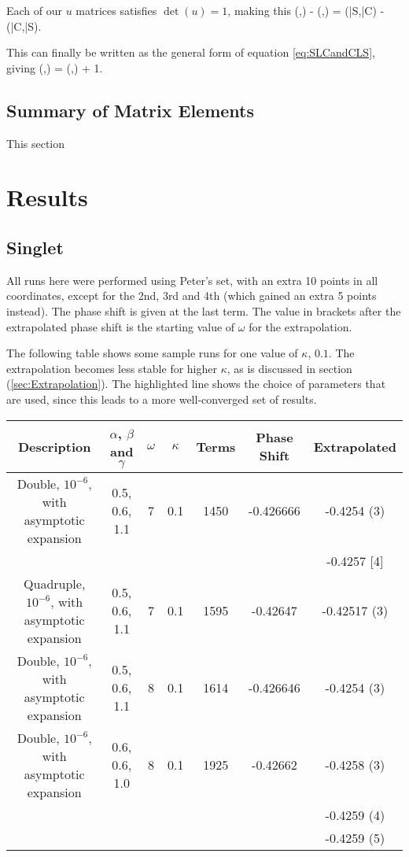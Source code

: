 \documentclass[Dissertation.tex]{subfiles}
\begin{document}
\noindent Each of our $u$ matrices satisfies $\det(u) = 1$, making this
\beq
(,) - (,) = (\bar{S},\bar{C}) - (\bar{C},\bar{S}).
\eeq

\noindent This can finally be written as the general form of equation \ref{eq:SLCandCLS}, giving
\beq
(,) = (,) + 1.
\label{eq:GenSLCandCLS}
\eeq

\subsection{Summary of Matrix Elements}
\label{SWaveMatrixSummary}
This section 



\section{Results}

\subsection{Singlet}
All runs here were performed using Peter's set, with an extra 10 points in all coordinates, except for the 2nd, 3rd and 4th (which gained an extra 5 points instead).  The phase shift is given at the last term.  The value in brackets after the extrapolated phase shift is the starting value of $\omega$ for the extrapolation.

The following table shows some sample runs for one value of $\kappa$, $0.1$.  The extrapolation becomes less stable for higher $\kappa$, as is discussed in section (\ref{sec:Extrapolation}).  The highlighted line shows the choice of parameters that are used, since this leads to a more well-converged set of results.

\begin{center}
\begin{tabular}{|c|c|c|c|c|c|c|}
\hline
Description & $\alpha$, $\beta$ and $\gamma$ & $\omega$ & $\kappa$ & Terms & Phase Shift & Extrapolated\\
\hline
\rowcolor{LightCyan} Double, $10^{-6}$, with asymptotic expansion & 0.5, 0.6, 1.1 & 7 & 0.1 & 1450 & -0.426666 & -0.4254 (3) \\
& & & & & & -0.4257 [4] \\
Quadruple, $10^{-6}$, with asymptotic expansion & 0.5, 0.6, 1.1 & 7 & 0.1 & 1595 & -0.42647 & -0.42517 (3) \\
Double, $10^{-6}$, with asymptotic expansion & 0.5, 0.6, 1.1 & 8 & 0.1 & 1614 & -0.426646 & -0.4254 (3) \\
Double, $10^{-6}$, with asymptotic expansion & 0.6, 0.6, 1.0 & 8 & 0.1 & 1925 & -0.42662 & -0.4258 (3) \\
& & & & & & -0.4259 (4) \\
& & & & & & -0.4259 (5) \\
\hline
\end{tabular}
\end{center}
\end{document}
